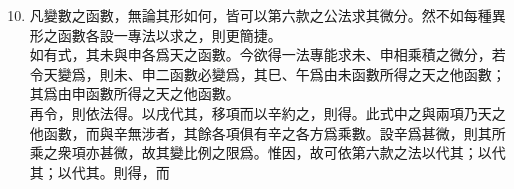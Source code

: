 \begin{enumerate} [label={第\chinese*款}]
	\setcounter{enumi}{9}
	\item 凡變數之函數，無論其形如何，皆可以第六款之公法求其微分。然不如每種異形之函數各設一專法以求之，則更簡捷。\\
	如有式\CJKmove，其未與申各爲天之函數。今欲得一法專能求未、申相乘積之微分，若令天變爲\CJKmove，則未、申二函數必變爲\CJKmove，其巳、午爲由未函數所得之天之他函數；其\CJKmove 爲由申函數所得之天之他函數。\\
	再令\CJKmove，則依法得\CJKmove。以戌代其\CJKmove，移項而以辛約之，則得\CJKmove。此式中之\CJKmove 與\CJKmove 兩項乃天之他函數，而與辛無涉者，其餘各項俱有辛之各方爲乘數。設辛爲甚微，則其所乘之衆項亦甚微，故其變比例之限爲\CJKmove。惟因\CJKmove，故可依第六款之法以\CJKmove 代其\CJKmove；以\CJKmove 代其\CJKmove；以\CJKmove 代其\CJKmove。則得\CJKmove，而\CJKmove
\end{enumerate}